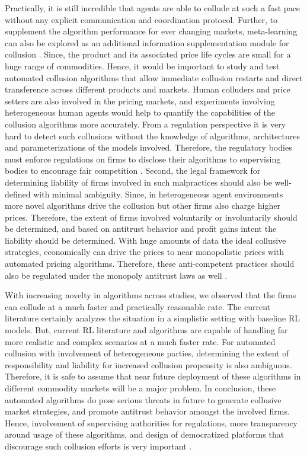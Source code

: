 \documentclass{article}
\begin{document}
Practically, it is still incredible that agents are able to collude at such a fast pace without any explicit communication and coordination protocol.
Further, to supplement the algorithm performance for ever changing markets, meta-learning can also be explored as an additional information supplementation module for collusion \cite{wang2018prefrontal}.
Since, the product and its associated price life cycles are small for a huge range of commodities.
Hence, it would be important to study and test automated collusion algorithms that allow immediate collusion restarts and direct transference across different products and markets.
Human colluders and price setters are also involved in the pricing markets, and experiments involving heterogeneous human agents would help to quantify the capabilities of the collusion algorithms more accurately.
From a regulation perspective it is very hard to detect such collusions without the knowledge of algorithms, architectures and parameterizations of the models involved.
Therefore, the regulatory bodies must enforce regulations on firms to disclose their algorithms to supervising bodies to encourage fair competition \cite{glauner2022assessment}.
Second, the legal framework for determining liability of firms involved in such malpractices should also be well-defined with minimal ambiguity.
Since, in heterogeneous agent environments more novel algorithms drive the collusion but other firms also charge higher prices.
Therefore, the extent of firms involved voluntarily or involuntarily should be determined, and based on antitrust behavior and profit gains intent the liability should be determined.
With huge amounts of data the ideal collusive strategies, economically can drive the prices to near monopolistic prices with automated pricing algorithms.
Therefore, these anti-competent practices should also be regulated under the monopoly antitrust laws as well \cite{ma2022regulating}.


With increasing novelty in algorithms across studies, we observed that the firms can collude at a much faster and practically reasonable rate.
The current literature certainly analyzes the situation in a simplistic setting with baseline RL models.
But, current RL literature and algorithms are capable of handling far more realistic and complex scenarios at a much faster rate.
For automated collusion with involvement of heterogeneous parties, determining the extent of responsibility and liability for increased collusion propensity is also ambiguous.
Therefore, it is safe to assume that near future deployment of these algorithms in different commodity markets will be a major problem.
In conclusion, these automated algorithms do pose serious threats in future to generate collusive market strategies, and promote antitrust behavior amongst the involved firms.
Hence, involvement of supervising authorities for regulations, more transparency around usage of these algorithms, and design of democratized platforms that discourage such collusion efforts is very important \cite{noothigattu2019teaching}.




\end{document}
